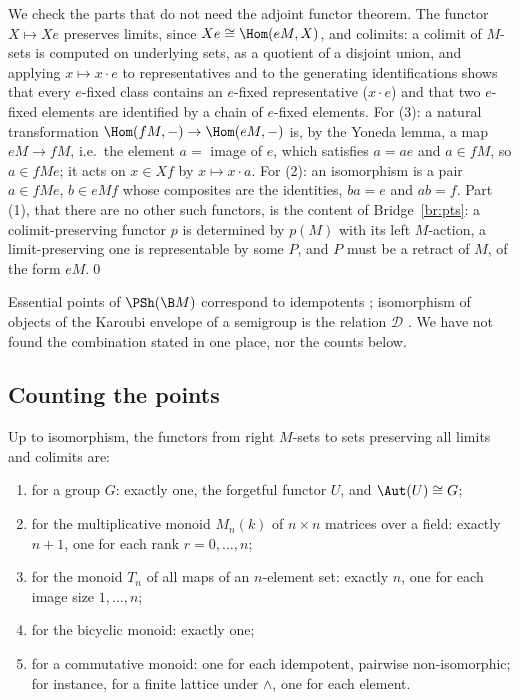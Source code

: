\direct{} We check the parts that do not need the adjoint functor theorem. The functor $X\mapsto Xe$ preserves limits, since $Xe\cong\Hom(eM,X)$, and colimits: a colimit of $M$-sets is computed on underlying sets, as a quotient of a disjoint union, and applying $x\mapsto x\cdot e$ to representatives and to the generating identifications shows that every $e$-fixed class contains an $e$-fixed representative ($x\cdot e$) and that two $e$-fixed elements are identified by a chain of $e$-fixed elements. For (3): a natural transformation $\Hom(fM,-)\to\Hom(eM,-)$ is, by the Yoneda lemma, a map $eM\to fM$, i.e.\ the element $a = $ image of $e$, which satisfies $a = a e$ and $a\in fM$, so $a\in fMe$; it acts on $x\in Xf$ by $x\mapsto x\cdot a$. For (2): an isomorphism is a pair $a\in fMe$, $b\in eMf$ whose composites are the identities, $ba = e$ and $ab = f$. Part (1), that there are no other such functors, is the content of Bridge~\ref{br:pts}: a colimit-preserving functor $p$ is determined by $p(M)$ with its left $M$-action, a limit-preserving one is representable by some $P$, and $P$ must be a retract of $M$, of the form $eM$.\qed

\status{} Essential points of $\PSh(\B M)$ correspond to idempotents \cite[Cor.~4.2]{rogers-1905}; isomorphism of objects of the Karoubi envelope of a semigroup is the relation $\mathcal D$ \cite[Prop.~3.1, \S3.2]{costa-steinberg}. We have not found the combination stated in one place, nor the counts below.

\subsection{Counting the points}

\begin{corollary}\label{co:countpoints}
Up to isomorphism, the functors from right $M$-sets to sets preserving all limits and colimits are:
\begin{enumerate}
\item for a group $G$: exactly one, the forgetful functor $U$, and $\Aut(U)\cong G$;
\item for the multiplicative monoid $M_n(k)$ of $n\times n$ matrices over a field: exactly $n+1$, one for each rank $r = 0,\dots,n$;
\item for the monoid $T_n$ of all maps of an $n$-element set: exactly $n$, one for each image size $1,\dots,n$;
\item for the bicyclic monoid: exactly one;
\item for a commutative monoid: one for each idempotent, pairwise non-isomorphic; for instance, for a finite lattice under $\wedge$, one for each element.
\end{enumerate}
\end{corollary}

